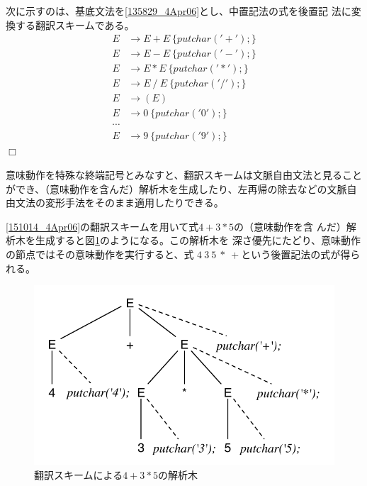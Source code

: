 \begin{example}
 次に示すのは、基底文法を\eqref{135829_4Apr06}とし、中置記法の式を後置記
 法に変換する翻訳スキームである。
 \begin{equation}
\begin{split}
  E & \rightarrow E + E\ \{ putchar('+'); \} \\
  E & \rightarrow E - E\ \{ putchar('-'); \} \\
  E & \rightarrow E \ast E\ \{ putchar('*'); \} \\
  E & \rightarrow E\ /\ E\ \{ putchar('/'); \} \\
  E & \rightarrow (E) \\
  E & \rightarrow 0\ \{ putchar('0'); \} \\
  \cdots \\
  E & \rightarrow 9\ \{ putchar('9'); \}
\end{split}\label{151014_4Apr06} 
\end{equation}$\Box$
\end{example}

意味動作を特殊な終端記号とみなすと、翻訳スキームは文脈自由文法と見ること
ができ、（意味動作を含んだ）解析木を生成したり、左再帰の除去などの文脈自
由文法の変形手法をそのまま適用したりできる。

\begin{example}
 \eqref{151014_4Apr06}の翻訳スキームを用いて式$4 + 3 * 5$の（意味動作を含
 んだ）解析木を生成すると図\ref{152516_4Apr06}のようになる。この解析木を
 深さ優先にたどり、意味動作の節点ではその意味動作を実行すると、式
 $4~3~5~\ast~+$という後置記法の式が得られる。
\end{example}

\begin{figure}
 \begin{center}
  \includegraphics{figure/translation_scheme_parse_tree.pdf}
 \end{center}
 \caption{翻訳スキームによる$4+3*5$の解析木}
 \label{152516_4Apr06}
\end{figure}

